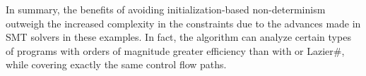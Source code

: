 

In summary, the benefits of avoiding
initialization-based non-determinism outweigh the increased
complexity in the constraints due to the advances made in SMT
solvers in these examples. In fact, the \symtxt{} algorithm can analyze certain types of programs with
orders of magnitude greater efficiency than with \gsetxt{} or
Lazier\#, while covering exactly the same control flow paths. 
